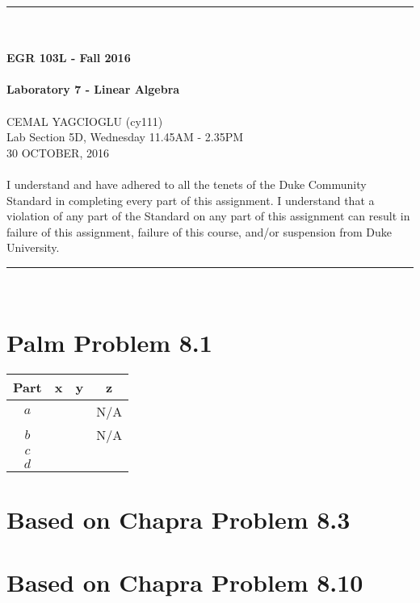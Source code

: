 \documentclass{article}
\begin{document}
\begin{center}
\rule{6.5in}{0.5mm}\\~\\
{\bf \large EGR 103L - Fall 2016}\\~\\
{\huge \bf Laboratory 7 - Linear Algebra}\\~\\
CEMAL YAGCIOGLU (cy111)\\
Lab Section 5D, Wednesday 11.45AM - 2.35PM\\
30 OCTOBER, 2016\\~\\
{\small  I understand and have adhered to all the tenets of the Duke
  Community Standard in completing every part of this assignment.  I
  understand that a violation of any part of the Standard on any part
  of this assignment can result in failure of this assignment, failure
  of this course, and/or suspension from Duke University.} 
\rule{6.5in}{0.5mm}\\
\end{center}
\tableofcontents
\listoffigures
\pagebreak
\section{Palm Problem 8.1}
\renewcommand{\arraystretch}{1.5}
\begin{center}
\begin{tabular}{|c||c|c|c|}\hline
Part & x & y & z \\ \hline \hline
$a$ &  &  & N/A\\ \hline
$b$ &  &  & N/A \\ \hline
$c$ &  &  & \\ \hline
$d$ &  &  & \\ \hline
\end{tabular}
\end{center}

\section{Based on Chapra Problem 8.3}

\section{Based on Chapra Problem 8.10}
\end{document}

